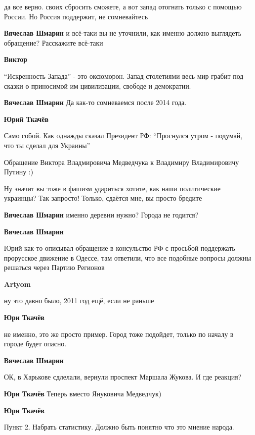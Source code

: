\begin{itemize}

да все верно. своих сбросить сможете, а вот запад отогнать только с помощью
России. Но Россия поддержит, не сомневайтесь

\textbf{Вячеслав Шмарин}
и всё-таки вы не уточнили, как именно должно выглядеть обращение? Расскажите всё-таки

\textbf{Виктор}

\enquote{Искренность Запада} - это оксюморон. Запад столетиями весь мир грабит под
сказки о приносимой им цивилизации, свободе и демократии.

\textbf{Вячеслав Шмарин}
Да как-то сомневаемся после 2014 года.

\textbf{Юрий Ткачёв}

Само собой. Как однажды сказал Президент РФ: \enquote{Проснулся утром - подумай, что ты
сделал для Украины}


Обращение Виктора Владмировича Медведчука к Владимиру Владимировичу Путину :)


Ну значит вы тоже в фашизм удариться хотите, как наши политические украинцы?
Так запросто! Только, сдаётся мне, вы просто бредите

\textbf{Вячеслав Шмарин}
именно деревни нужно? Города не годится?

\textbf{Вячеслав Шмарин}

Юрий как-то описывал обращение в консульство РФ с просьбой поддержать
прорусское движение в Одессе, там ответили, что все подобные вопросы должны
решаться через Партию Регионов

\textbf{Artyom}

ну это давно было, 2011 год ещё, если не раньше

\textbf{Юри Ткачёв}

не именно, это же просто пример. Город тоже подойдет, только по началу в городе
будет опасно.

\textbf{Вячеслав Шмарин}

ОК, в Харькове сдлелали, вернули проспект Маршала Жукова. И где реакция?

\textbf{Юри Ткачёв}
Теперь вместо Януковича Медведчук)

\textbf{Юри Ткачёв}

Пункт 2. Набрать статистику. Должно быть понятно что это мнение народа.


\end{itemize}
